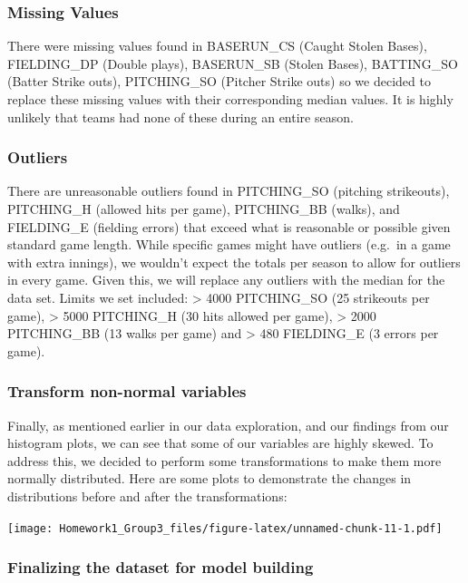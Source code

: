 \documentclass[
]{article}
\begin{document}
\hypertarget{missing-values}{%
\subsubsection{Missing Values}\label{missing-values}}

There were missing values found in BASERUN\_CS (Caught Stolen Bases),
FIELDING\_DP (Double plays), BASERUN\_SB (Stolen Bases), BATTING\_SO
(Batter Strike outs), PITCHING\_SO (Pitcher Strike outs) so we decided
to replace these missing values with their corresponding median values.
It is highly unlikely that teams had none of these during an entire
season.

\hypertarget{outliers}{%
\subsubsection{Outliers}\label{outliers}}

There are unreasonable outliers found in PITCHING\_SO (pitching
strikeouts), PITCHING\_H (allowed hits per game), PITCHING\_BB (walks),
and FIELDING\_E (fielding errors) that exceed what is reasonable or
possible given standard game length. While specific games might have
outliers (e.g.~in a game with extra innings), we wouldn't expect the
totals per season to allow for outliers in every game. Given this, we
will replace any outliers with the median for the data set. Limits we
set included: \textgreater{} 4000 PITCHING\_SO (25 strikeouts per game),
\textgreater{} 5000 PITCHING\_H (30 hits allowed per game),
\textgreater{} 2000 PITCHING\_BB (13 walks per game) and \textgreater{}
480 FIELDING\_E (3 errors per game).

\hypertarget{transform-non-normal-variables}{%
\subsubsection{Transform non-normal
variables}\label{transform-non-normal-variables}}

Finally, as mentioned earlier in our data exploration, and our findings
from our histogram plots, we can see that some of our variables are
highly skewed. To address this, we decided to perform some
transformations to make them more normally distributed. Here are some
plots to demonstrate the changes in distributions before and after the
transformations:

\texttt{[image: Homework1\_Group3\_files/figure-latex/unnamed-chunk-11-1.pdf]}

\hypertarget{finalizing-the-dataset-for-model-building}{%
\subsubsection{Finalizing the dataset for model
building}\label{finalizing-the-dataset-for-model-building}}
\end{document}
